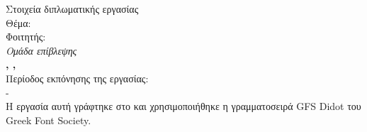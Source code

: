 
\pagestyle{empty}
\begin{center}
\Large{Στοιχεία διπλωματικής εργασίας}\\[1cm]
{\large Θέμα:}
\textbf{\large \doctitle}\\[1cm]
\large {Φοιτητής: \textbf{\nomme}\\[1cm]
\emph{\large{Ομάδα επίβλεψης}}\\[0.3cm]
\textbf{\supname, \suptitle, \uoP}\\
Περίοδος εκπόνησης της εργασίας:\\ {\arximonthyear} - {\telosmonthyear}\\[1cm]
Η εργασία αυτή γράφτηκε στο \XeLaTeX{} και χρησιμοποιήθηκε η γραμματοσειρά GFS Didot του Greek Font Society.}
\end{center}